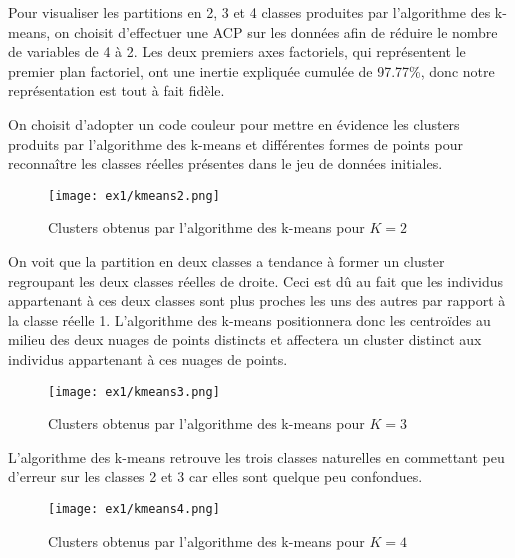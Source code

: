 \documentclass{article}
\begin{document}
\begin{multicols}{2}
Pour visualiser les partitions en 2, 3 et 4 classes produites par l'algorithme
des k-means, on choisit d'effectuer une ACP sur les données afin de réduire le
nombre de variables de 4 à 2. Les deux premiers axes factoriels, qui
représentent le premier plan factoriel, ont une inertie expliquée cumulée de
97.77\%, donc notre représentation est tout à fait fidèle.

On choisit d'adopter un code couleur pour mettre en évidence les clusters
produits par l'algorithme des k-means et différentes formes de points pour
reconnaître les classes réelles présentes dans le jeu de données initiales.

\begin{figure}[H]
    \begin{center}
        \texttt{[image: ex1/kmeans2.png]}
        \centering
        \captionsetup{justification=centering}
        \caption{\label{fig:kmeans2}Clusters obtenus par l'algorithme des k-means pour $K =2$}
    \end{center}
\end{figure}

On voit que la partition en deux classes a tendance à former un cluster
regroupant les deux classes réelles de droite. Ceci est dû au fait que les
individus appartenant à ces deux classes sont plus proches les uns des autres
par rapport à la classe réelle 1. L'algorithme des k-means positionnera donc les
centroïdes au milieu des deux nuages de points distincts et affectera un cluster
distinct aux individus appartenant à ces nuages de points.

\begin{figure}[H]
    \begin{center}
        \texttt{[image: ex1/kmeans3.png]}
        \centering
        \captionsetup{justification=centering}
        \caption{\label{fig:kmeans3}Clusters obtenus par l'algorithme des k-means pour $K = 3$}
    \end{center}
\end{figure}

L'algorithme des k-means retrouve les trois classes naturelles en commettant peu
d'erreur sur les classes 2 et 3 car elles sont quelque peu confondues.

\begin{figure}[H]
    \begin{center}
        \texttt{[image: ex1/kmeans4.png]}
        \centering
        \captionsetup{justification=centering}
        \caption{\label{fig:kmeans4}Clusters obtenus par l'algorithme des k-means pour $K = 4$}
    \end{center}
\end{figure}


\end{multicols}
\end{document}
